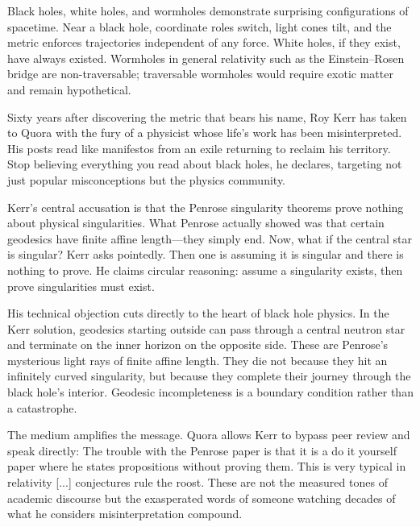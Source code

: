 Black holes, white holes, and wormholes demonstrate surprising configurations of spacetime. Near a black hole, coordinate roles switch, light cones tilt, and the metric enforces trajectories independent of any force. White holes, if they exist, have always existed. Wormholes in general relativity such as the Einstein–Rosen bridge are non-traversable; traversable wormholes would require exotic matter and remain hypothetical.
\begin{commentary}
Sixty years after discovering the metric that bears his name, Roy Kerr has taken to Quora with the fury of a physicist whose life's work has been misinterpreted. His posts read like manifestos from an exile returning to reclaim his territory. \QSOpen{}Stop believing everything you read about black holes,\QSClose{} he declares, targeting not just popular misconceptions but the physics community.

Kerr's central accusation is that the Penrose singularity theorems prove nothing about physical singularities. What Penrose actually showed was that certain geodesics have finite affine length—they simply end. \QSOpen{}Now, what if the central star is singular?\QSClose{} Kerr asks pointedly. \QSOpen{}Then one is assuming it is singular and there is nothing to prove.\QSClose{} He claims circular reasoning: assume a singularity exists, then \QSOpen{}prove\QSClose{} singularities must exist.

His technical objection cuts directly to the heart of black hole physics. In the Kerr solution, geodesics starting outside can pass through a central neutron star and terminate on the inner horizon on the opposite side. These are Penrose's \QSOpen{}mysterious light rays of finite affine length.\QSClose{} They die not because they hit an infinitely curved singularity, but because they complete their journey through the black hole's interior. Geodesic incompleteness is a boundary condition rather than a catastrophe.

The medium amplifies the message. Quora allows Kerr to bypass peer review and speak directly: \QSOpen{}The trouble with the Penrose paper is that it is a \QENOpen{}do it yourself\QENClose{} paper where he states propositions without proving them. This is very typical in relativity [...] conjectures \QENOpen{}rule the roost.\QENClose{}\QSClose{} These are not the measured tones of academic discourse but the exasperated words of someone watching decades of what he considers misinterpretation compound.


\end{commentary}
